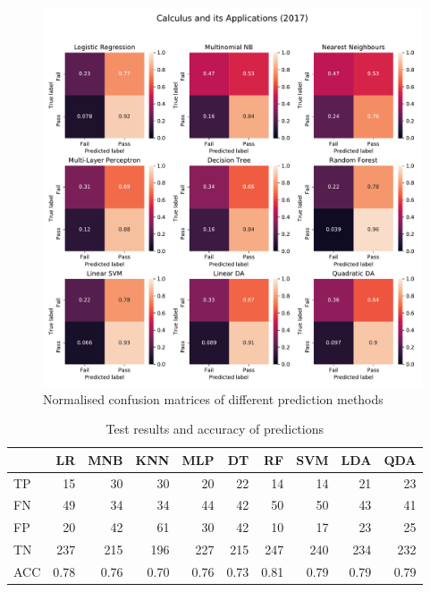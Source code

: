 \documentclass[a4paper]{report}
\begin{document}
\begin{figure}[H]
  \centering
  \includegraphics[width=\linewidth]{fig/ML_CAP_bin_17.pdf}
  \caption{\label{fig:ML_CAP_bin_17}Normalised confusion matrices of different prediction methods}
\end{figure}

\begin{table}[H]
  \centering
  \begin{tabular}{lrrrrrrrrr}
    \toprule
    {} &   LR &  MNB &  KNN &  MLP &   DT &   RF &  SVM &  LDA &  QDA \\
    \midrule
    TP  &   15 &   30 &   30 &   20 &   22 &   14 &   14 &   21 &   23 \\
    FN  &   49 &   34 &   34 &   44 &   42 &   50 &   50 &   43 &   41 \\
    FP  &   20 &   42 &   61 &   30 &   42 &   10 &   17 &   23 &   25 \\
    TN  &  237 &  215 &  196 &  227 &  215 &  247 &  240 &  234 &  232 \\
    ACC & 0.78 & 0.76 & 0.70 & 0.76 & 0.73 & 0.81 & 0.79 & 0.79 & 0.79 \\
    \bottomrule
  \end{tabular}
  \caption{\label{tab:ML_CAP_bin_17}Test results and accuracy of predictions}
\end{table}
\end{document}
